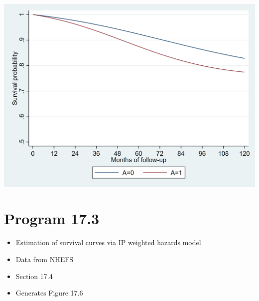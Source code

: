 \documentclass[
  10pt,
  a4paper,
]{book}
\providecommand{\tightlist}{%
  \setlength{\itemsep}{0pt}\setlength{\parskip}{0pt}}
\begin{document}
\begin{center}\includegraphics[width=0.85\linewidth]{./figs/stata-fig-17-2} \end{center}

\hypertarget{program-17.3-1}{%
\section{Program 17.3}\label{program-17.3-1}}

\begin{itemize}
\tightlist
\item
  Estimation of survival curves via IP weighted hazards model
\item
  Data from NHEFS
\item
  Section 17.4
\item
  Generates Figure 17.6
\end{itemize}
\end{document}
